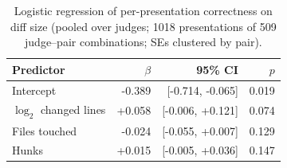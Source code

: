 \begin{table}[t]
\caption{Logistic regression of per-presentation correctness on diff size (pooled over judges; 1018 presentations of 509 judge--pair combinations; SEs clustered by pair).}
\label{tab:scaling}
\centering\footnotesize
\begin{tabular}{@{}lrrr@{}}
\toprule
Predictor & $\beta$ & 95\% CI & $p$ \\
\midrule
Intercept & -0.389 & [-0.714, -0.065] & 0.019 \\
$\log_2$ changed lines & +0.058 & [-0.006, +0.121] & 0.074 \\
Files touched & -0.024 & [-0.055, +0.007] & 0.129 \\
Hunks & +0.015 & [-0.005, +0.036] & 0.147 \\
\bottomrule
\end{tabular}
\end{table}
